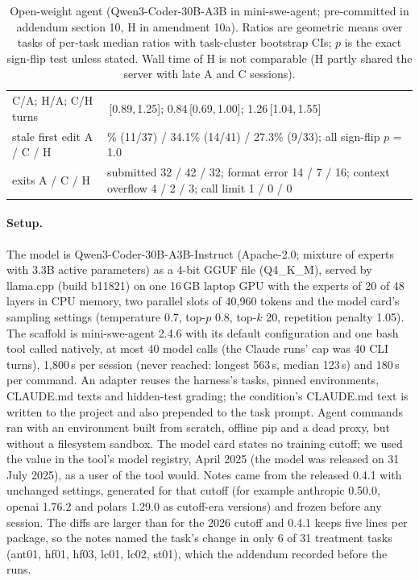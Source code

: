 \documentclass[11pt]{article}
\newcommand{\ci}[2]{\,[#1,\,#2]}
\begin{document}
\begin{table}[t]
\begin{tabular}{>{\raggedright\arraybackslash}p{4.6cm}>{\raggedright\arraybackslash}p{10.4cm}}
C/A; H/A; C/H turns & 1.06\ci{0.89}{1.25}; 0.84\ci{0.69}{1.00}; 1.26\ci{1.04}{1.55} \\
stale first edit A / C / H & 29.7\% (11/37) / 34.1\% (14/41) / 27.3\% (9/33); all sign-flip $p$ = 1.0 \\
exits A / C / H & submitted 32 / 42 / 32; format error 14 / 7 / 16; context overflow 4 / 2 / 3; call limit 1 / 0 / 0 \\
\bottomrule
\end{tabular}
\caption{Open-weight agent (Qwen3-Coder-30B-A3B in mini-swe-agent; pre-committed in addendum section 10, H in amendment 10a). Ratios are geometric means over tasks of per-task median ratios with task-cluster bootstrap CIs; $p$ is the exact sign-flip test unless stated. Wall time of H is not comparable (H partly shared the server with late A and C sessions).}
\label{tab:open}
\end{table}

\paragraph{Setup.}
The model is Qwen3-Coder-30B-A3B-Instruct (Apache-2.0; mixture of experts with 3.3B active parameters) as a 4-bit GGUF file (Q4\_K\_M), served by llama.cpp (build b11821) on one 16\,GB laptop GPU with the experts of 20 of 48 layers in CPU memory, two parallel slots of 40,960 tokens and the model card's sampling settings (temperature 0.7, top-$p$ 0.8, top-$k$ 20, repetition penalty 1.05).
The scaffold is mini-swe-agent 2.4.6 with its default configuration and one bash tool called natively, at most 40 model calls (the Claude runs' cap was 40 CLI turns), 1,800\,s per session (never reached: longest 563\,s, median 123\,s) and 180\,s per command.
An adapter reuses the harness's tasks, pinned environments, CLAUDE.md texts and hidden-test grading; the condition's CLAUDE.md text is written to the project and also prepended to the task prompt.
Agent commands ran with an environment built from scratch, offline pip and a dead proxy, but without a filesystem sandbox.
The model card states no training cutoff; we used the value in the tool's model registry, April 2025 (the model was released on 31 July 2025), as a user of the tool would.
Notes came from the released 0.4.1 with unchanged settings, generated for that cutoff (for example anthropic 0.50.0, openai 1.76.2 and polars 1.29.0 as cutoff-era versions) and frozen before any session.
The diffs are larger than for the 2026 cutoff and 0.4.1 keeps five lines per package, so the notes named the task's change in only 6 of 31 treatment tasks (ant01, hf01, hf03, lc01, lc02, st01), which the addendum recorded before the runs.
\end{document}
